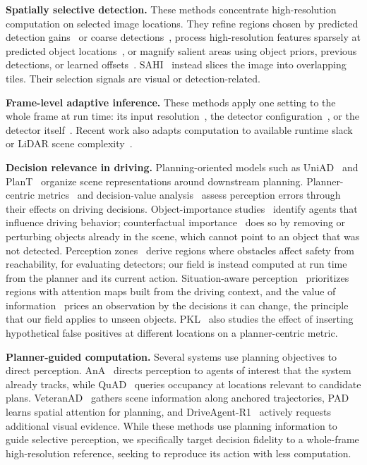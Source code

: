 \documentclass[10pt,twocolumn,letterpaper]{article}
\theoremstyle{definition}
\theoremstyle{remark}
\begin{document}
\noindent\textbf{Spatially selective detection.}
These methods concentrate high-resolution computation on selected image locations.
They refine regions chosen by predicted detection gains~\cite{dzn,patchdrop} or coarse detections~\cite{clusdet,ufpmp}, process high-resolution features sparsely at predicted object locations~\cite{querydet,esod}, or magnify salient areas using object priors, previous detections, or learned offsets~\cite{fovea,lzu,zoomdet}.
SAHI~\cite{sahi} instead slices the image into overlapping tiles.
Their selection signals are visual or detection-related.

\noindent\textbf{Frame-level adaptive inference.}
These methods apply one setting to the whole frame at run time: its input resolution~\cite{adascale}, the detector configuration~\cite{chanakya}, or the detector itself~\cite{bgtada}.
Recent work also adapts computation to available runtime slack~\cite{slackdrive} or LiDAR scene complexity~\cite{thinkasneeded}.

\noindent\textbf{Decision relevance in driving.}
Planning-oriented models such as UniAD~\cite{uniad} and PlanT~\cite{plant} organize scene representations around downstream planning.
Planner-centric metrics~\cite{pkl,tip} and decision-value analysis~\cite{deep} assess perception errors through their effects on driving decisions.
Object-importance studies~\cite{goaloie,droid,cfrelevance} identify agents that influence driving behavior; counterfactual importance~\cite{cfimportance} does so by removing or perturbing objects already in the scene, which cannot point to an object that was not detected.
Perception zones~\cite{perceptionzones,maneuverzones} derive regions where obstacles affect safety from reachability, for evaluating detectors; our field is instead computed at run time from the planner and its current action.
Situation-aware perception~\cite{henning} prioritizes regions with attention maps built from the driving context, and the value of information~\cite{howard} prices an observation by the decisions it can change, the principle that our field applies to unseen objects.
PKL~\cite{pkl} also studies the effect of inserting hypothetical false positives at different locations on a planner-centric metric.

\noindent\textbf{Planner-guided computation.}
Several systems use planning objectives to direct perception.
AnA~\cite{ana} directs perception to agents of interest that the system already tracks, while QuAD~\cite{quad} queries occupancy at locations relevant to candidate plans.
VeteranAD~\cite{veteranad} gathers scene information along anchored trajectories, PAD~\cite{pad} learns spatial attention for planning, and DriveAgent-R1~\cite{driveagentr1} actively requests additional visual evidence.
While these methods use planning information to guide selective perception, we specifically target decision fidelity to a whole-frame high-resolution reference, seeking to reproduce its action with less computation.
\end{document}
